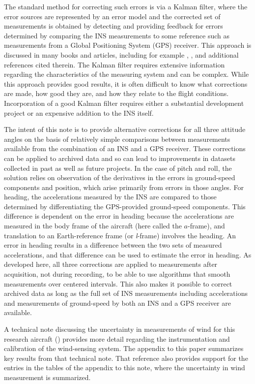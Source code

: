\documentclass[english,british,amtd,bookmarks=false,unicode=true]{copernicus}\usepackage[]{graphicx}\usepackage[]{color}
\begin{document}
The standard method for correcting such errors is via a Kalman filter,
where the error sources are represented by an error model and the
corrected set of measurements is obtained by detecting and providing
feedback for errors determined by comparing the INS measurements to
some reference such as measurements from a Global Positioning System
(GPS) receiver. This approach is discussed in many books and articles,
including for example \citet{noureldin2013fundamentals}, \citet{groves2013PrinciplesGNSS},
and additional references cited therein. The Kalman filter requires
extensive information regarding the characteristics of the measuring
system and can be complex. While this approach provides good results,
it is often difficult to know what corrections are made, how good
they are, and how they relate to the flight conditions. Incorporation
of a good Kalman filter requires either a substantial development
project or an expensive addition to the INS itself. 

The intent of this note is to provide alternative corrections for
all three attitude angles on the basis of relatively simple comparisons
between measurements available from the combination of an INS and
a GPS receiver. These corrections can be applied to archived data
and so can lead to improvements in datasets collected in past as well
as future projects. In the case of pitch and roll, the solution relies
on observation of the derivatives in the errors in ground-speed components
and position, which arise primarily from errors in those angles. For
heading, the accelerations measured by the INS are compared to those
determined by differentiating the GPS-provided ground-speed components.
This difference is dependent on the error in heading because the accelerations
are measured in the body frame of the aircraft (here called\emph{
}the $a$-frame), and translation to an Earth-reference frame (or
\emph{l}-frame) involves the heading. An error in heading results
in a difference between the two sets of measured accelerations, and
that difference can be used to estimate the error in heading. As developed
here, all three corrections are applied to measurements after acquisition,
not during recording, to be able to use algorithms that smooth measurements
over centered intervals. This also makes it possible to correct archived
data as long as the full set of INS measurements including accelerations
and measurements of ground-speed by both an INS and a GPS receiver
are available.

A technical note discussing the uncertainty in measurements of wind
for this research aircraft (\citet{Cooper2016ncartn}) provides more
detail regarding the instrumentation and calibration of the wind-sensing
system. The appendix to this paper summarizes key results from that
technical note. That reference also provides support for the entries
in the tables of the appendix to this note, where the uncertainty
in wind measurement is summarized.
\end{document}
